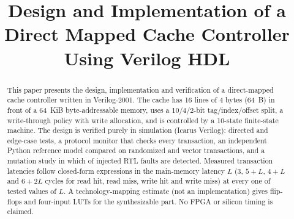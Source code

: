 \documentclass[conference]{IEEEtran}
\begin{document}
\title{Design and Implementation of a Direct Mapped Cache Controller Using Verilog HDL}

\author{
\and
{}
\and
{}
\and
{}
\and
{}
}

\maketitle

\begin{abstract}
This paper presents the design, implementation and verification of a direct-mapped cache controller written in Verilog-2001. The cache has 16 lines of 4 bytes (64~B) in front of a 64~KiB byte-addressable memory, uses a 10/4/2-bit tag/index/offset split, a write-through policy with write allocation, and is controlled by a 10-state finite-state machine. The design is verified purely in simulation (Icarus Verilog): \nDirTests{} directed and edge-case tests, a protocol monitor that checks every transaction, an independent Python reference model compared on \nRefTxns{} randomized and vector transactions, and a mutation study in which \nMutDetPhaseTwo{} of \nMutants{} injected RTL faults are detected. Measured transaction latencies follow closed-form expressions in the main-memory latency $L$ (3, $5{+}L$, $4{+}L$ and $6{+}2L$ cycles for read hit, read miss, write hit and write miss) at every one of \nFixedLats{} tested values of $L$. A technology-mapping estimate (not an implementation) gives \nIceFFTot{} flip-flops and \nIceLutTot{} four-input LUTs for the synthesizable part. No FPGA or silicon timing is claimed.
\end{abstract}
\end{document}
